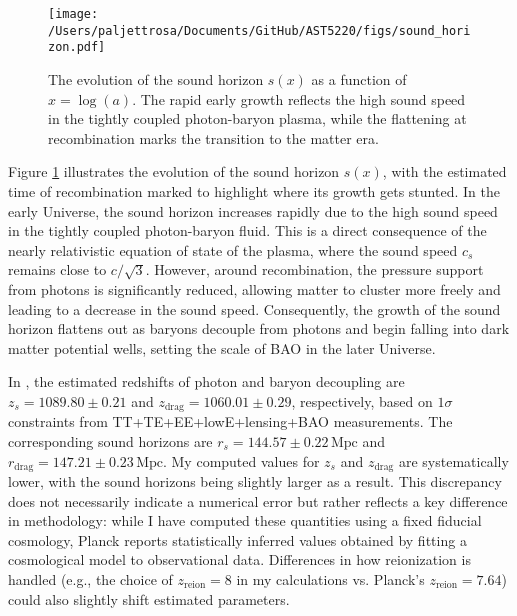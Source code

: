 \documentclass{aa}
\numberwithin{equation}{section}
\numberwithin{table}{section}
\numberwithin{figure}{section}
\begin{document}


\begin{figure}
  \centering
  \texttt{[image: /Users/paljettrosa/Documents/GitHub/AST5220/figs/sound\_horizon.pdf]}
  \caption{The evolution of the sound horizon $s(x)$ as a function of $x = \log(a)$. The rapid early growth reflects the high sound speed in the tightly coupled photon-baryon plasma, while the flattening at recombination marks the transition to the matter era.}\label{fig:sound horizon}
\end{figure}

Figure \ref{fig:sound horizon} illustrates the evolution of the sound horizon $s(x)$, with the estimated time of recombination marked to highlight where its growth gets stunted. In the early Universe, the sound horizon increases rapidly due to the high sound speed in the tightly coupled photon-baryon fluid. This is a direct consequence of the nearly relativistic equation of state of the plasma, where the sound speed $c_s$ remains close to $c/\sqrt{3}$. However, around recombination, the pressure support from photons is significantly reduced, allowing matter to cluster more freely and leading to a decrease in the sound speed. Consequently, the growth of the sound horizon flattens out as baryons decouple from photons and begin falling into dark matter potential wells, setting the scale of BAO in the later Universe.

In \cite{Planck}, the estimated redshifts of photon and baryon decoupling are $z_s = 1089.80\pm0.21$ and $z_\text{drag} = 1060.01\pm0.29$, respectively, based on $1\sigma$ constraints from TT+TE+EE+lowE+lensing+BAO measurements. The corresponding sound horizons are $r_s = 144.57\pm0.22\,\text{Mpc}$ and $r_\text{drag} = 147.21\pm0.23\,\text{Mpc}$. My computed values for $z_s$ and $z_\text{drag}$ are systematically lower, with the sound horizons being slightly larger as a result. This discrepancy does not necessarily indicate a numerical error but rather reflects a key difference in methodology: while I have computed these quantities using a fixed fiducial cosmology, Planck reports statistically inferred values obtained by fitting a cosmological model to observational data. Differences in how reionization is handled (e.g., the choice of $z_\text{reion} = 8$ in my calculations vs. Planck's $z_\text{reion} = 7.64$) could also slightly shift estimated parameters.
\end{document}
